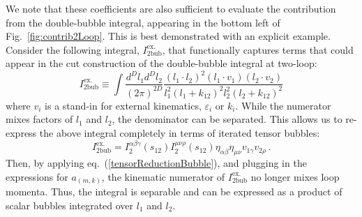 \documentclass[12pt,letter]{article}
\def\Fig#1{fig.~{\ref{#1}}}
\def\Fig#1{Fig.~{\ref{#1}}}
\def\eqn#1{eq.~(\ref{#1})}
\begin{document}
We note that these coefficients are also sufficient to evaluate the contribution from the double-bubble integral, appearing in the bottom left of \Fig{fig:contrib2Loop}. This is best demonstrated with an explicit example. Consider the following integral, $I^{\text{ex}.}_{\text{2bub}}$, that functionally captures terms that could appear in the cut construction of the double-bubble integral at two-loop:
\begin{equation}
I^{\text{ex}.}_{\text{2bub}} \equiv \int \frac{d^D l_{1}d^D l_{2}}{(2\pi)^{2D}} \frac{(l_1\!\cdot\! l_2)^2(l_1\!\cdot\! v_1)(l_2\!\cdot\! v_2)}{l_1^2(l_1+k_{12})^2 l_2^2(l_2+k_{12})^2}
\end{equation}
where $v_i$ is a stand-in for external kinematics, $\varepsilon_i$ or $k_i$. While the numerator mixes factors of $l_1$ and $l_2$, the denominator can be separated. This allows us to re-express the above integral completely in terms of iterated tensor bubbles:
\begin{equation}
I^{\text{ex}.}_{\text{2bub}} = I_{2}^{\alpha\beta\gamma}(s_{12}) I_2^{\mu\nu\rho}(s_{12})\eta_{\alpha\beta}\eta_{\mu\nu}v_{1 \gamma}v_{2 \rho}\,.
\end{equation}
Then, by applying \eqn{tensorReductionBubble}, and plugging in the expressions for $a_{(m,k)}$, the kinematic numerator of $I^{\text{ex}.}_{\text{2bub}}$ no longer mixes loop momenta. Thus, the integral is separable and can be expressed as a product of scalar bubbles integrated over $l_1$ and $l_2$. 
\end{document}
